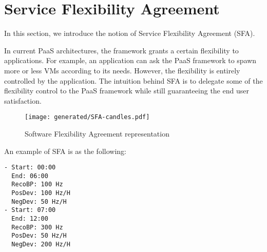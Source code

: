 \section{Service Flexibility Agreement}
\label{sec:sfa}

In this section, we introduce the notion of Service Flexibility Agreement (SFA). 

In current PaaS architectures, the framework grants a certain flexibility to applications.
For example, an application can ask the PaaS framework to spawn more or less VMs according to its needs.
However, the flexibility is entirely controlled by the application.
The intuition behind SFA is to delegate some of the flexibility control to the PaaS framework while still guaranteeing the end user satisfaction.






 

\begin{figure}[h]
\centering
\texttt{[image: generated/SFA-candles.pdf]}
\caption{Software  Flexibility Agreement representation}
\label{fig:EASC}
\end{figure}

An example of SFA is as the following:
\begin{lstlisting}[caption={SFA example}, label={lst:SFA}]
- Start: 00:00
  End: 06:00
  RecoBP: 100 Hz
  PosDev: 100 Hz/H
  NegDev: 50 Hz/H
- Start: 07:00
  End: 12:00
  RecoBP: 300 Hz
  PosDev: 50 Hz/H
  NegDev: 200 Hz/H
\end{lstlisting}

